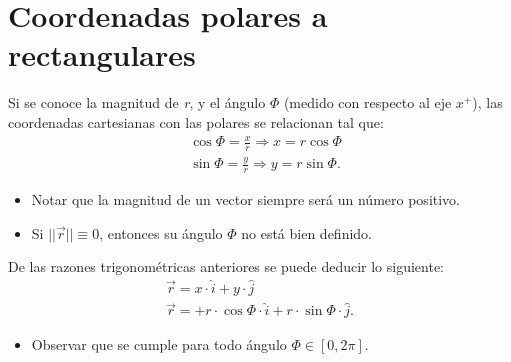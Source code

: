 \documentclass[12pt]{article}
\begin{document}
\section{Coordenadas polares a rectangulares}
\begin{minipage}{0.5\textwidth}
Si se conoce la magnitud de \emph{r}, y el ángulo $\Phi$ (medido con respecto al eje $x^{+}$), las coordenadas cartesianas con las polares se relacionan tal que:
	\begin{align*}
		& \cos\Phi = \frac{x}{r} \Longrightarrow x=r 
\cos \Phi \\ 
& \sin \Phi = \frac{y}{r} \Longrightarrow y = r \sin \Phi.
	\end{align*}
		\begin{itemize}[leftmargin=2cm]
			\item Notar que la magnitud de un vector siempre será un número positivo.
			\item Si $|| \vec{r} || \equiv 0$, entonces su ángulo $\Phi $ no está bien definido.
		\end{itemize}
\end{minipage}
\begin{minipage}{0.5\textwidth}
\begin{center}

\end{center}

\end{minipage}
De las razones trigonométricas anteriores se puede deducir lo siguiente: 
	\begin{align*}
		\vec{r}=x \cdot \hat{i} + y \cdot \hat{j} \\ \vec{r}=+ r \cdot \cos \Phi \cdot \hat{i}  + r\cdot \sin \Phi \cdot \hat{j}.
	\end{align*}
		\begin{itemize}[leftmargin=2cm]
			\item Observar que se cumple para todo ángulo $\Phi \in [0,2 \pi]$.
 		\end{itemize}
\end{document}
